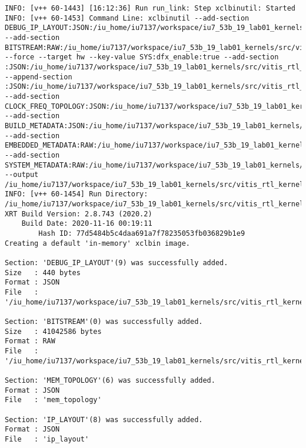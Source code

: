 \begin{center}
\begin{lstlisting}[label=lst:vlog,caption=Файл v++\_vinc.log]
INFO: [v++ 60-1443] [16:12:36] Run run_link: Step xclbinutil: Started
INFO: [v++ 60-1453] Command Line: xclbinutil --add-section DEBUG_IP_LAYOUT:JSON:/iu_home/iu7137/workspace/iu7_53b_19_lab01_kernels/src/vitis_rtl_kernel/rtl_kernel_wizard_1/_x/link/int/debug_ip_layout.rtd --add-section BITSTREAM:RAW:/iu_home/iu7137/workspace/iu7_53b_19_lab01_kernels/src/vitis_rtl_kernel/rtl_kernel_wizard_1/_x/link/int/partial.bit --force --target hw --key-value SYS:dfx_enable:true --add-section :JSON:/iu_home/iu7137/workspace/iu7_53b_19_lab01_kernels/src/vitis_rtl_kernel/rtl_kernel_wizard_1/_x/link/int/vinc.rtd --append-section :JSON:/iu_home/iu7137/workspace/iu7_53b_19_lab01_kernels/src/vitis_rtl_kernel/rtl_kernel_wizard_1/_x/link/int/appendSection.rtd --add-section CLOCK_FREQ_TOPOLOGY:JSON:/iu_home/iu7137/workspace/iu7_53b_19_lab01_kernels/src/vitis_rtl_kernel/rtl_kernel_wizard_1/_x/link/int/vinc_xml.rtd --add-section BUILD_METADATA:JSON:/iu_home/iu7137/workspace/iu7_53b_19_lab01_kernels/src/vitis_rtl_kernel/rtl_kernel_wizard_1/_x/link/int/vinc_build.rtd --add-section EMBEDDED_METADATA:RAW:/iu_home/iu7137/workspace/iu7_53b_19_lab01_kernels/src/vitis_rtl_kernel/rtl_kernel_wizard_1/_x/link/int/vinc.xml --add-section SYSTEM_METADATA:RAW:/iu_home/iu7137/workspace/iu7_53b_19_lab01_kernels/src/vitis_rtl_kernel/rtl_kernel_wizard_1/_x/link/int/systemDiagramModelSlrBaseAddress.json --output /iu_home/iu7137/workspace/iu7_53b_19_lab01_kernels/src/vitis_rtl_kernel/rtl_kernel_wizard_1/vinc.xclbin
INFO: [v++ 60-1454] Run Directory: /iu_home/iu7137/workspace/iu7_53b_19_lab01_kernels/src/vitis_rtl_kernel/rtl_kernel_wizard_1/_x/link/run_link
XRT Build Version: 2.8.743 (2020.2)
    Build Date: 2020-11-16 00:19:11
        Hash ID: 77d5484b5c4daa691a7f78235053fb036829b1e9
Creating a default 'in-memory' xclbin image.

Section: 'DEBUG_IP_LAYOUT'(9) was successfully added.
Size   : 440 bytes
Format : JSON
File   : '/iu_home/iu7137/workspace/iu7_53b_19_lab01_kernels/src/vitis_rtl_kernel/rtl_kernel_wizard_1/_x/link/int/debug_ip_layout.rtd'

Section: 'BITSTREAM'(0) was successfully added.
Size   : 41042586 bytes
Format : RAW
File   : '/iu_home/iu7137/workspace/iu7_53b_19_lab01_kernels/src/vitis_rtl_kernel/rtl_kernel_wizard_1/_x/link/int/partial.bit'

Section: 'MEM_TOPOLOGY'(6) was successfully added.
Format : JSON
File   : 'mem_topology'

Section: 'IP_LAYOUT'(8) was successfully added.
Format : JSON
File   : 'ip_layout'


\end{lstlisting}
\end{center}
